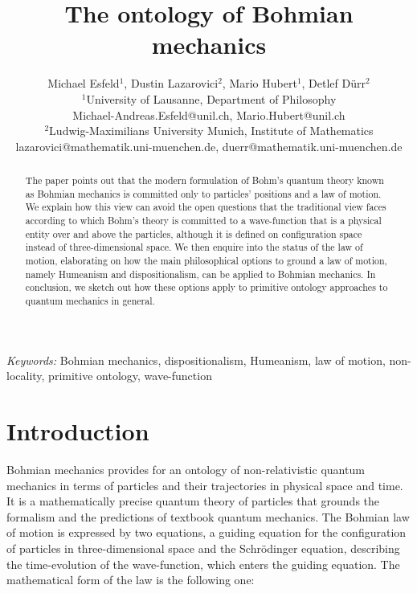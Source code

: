 \documentclass[12pt]{article}
\title{The ontology of Bohmian mechanics }
\author{Michael Esfeld$^1$, Dustin Lazarovici$^2$,
          Mario Hubert$^1$, Detlef D\"urr$^2$\\[1.5ex]
\small $^1$University of Lausanne, Department of Philosophy\\
                 \small Michael-Andreas.Esfeld@unil.ch, Mario.Hubert@unil.ch\\
\small $^2$Ludwig-Maximilians University Munich, Institute of Mathematics\\
\small   lazarovici@mathematik.uni-muenchen.de, duerr@mathematik.uni-muenchen.de}
\date{}
\theoremstyle{definition}
\begin{document}
\maketitle

\begin{abstract}
\noindent The paper points out that the modern formulation of Bohm's quantum theory known as Bohmian mechanics is committed only to particles' positions and a law of motion. We explain how this view can avoid the open questions that the traditional view faces according to which Bohm's theory is committed to a wave-function that is a physical entity over and above the particles, although it is defined on configuration space instead of three-dimensional space. We then enquire into the status of the law of motion, elaborating on how the main philosophical options to ground a law of motion, namely Humeanism and dispositionalism, can be applied to Bohmian mechanics. In conclusion, we sketch out how these options apply to primitive ontology approaches to quantum mechanics in general.
\end{abstract}

\noindent \textit{Keywords:} Bohmian mechanics, dispositionalism, Humeanism, law of motion, non-locality, primitive ontology, wave-function

\newpage
\tableofcontents{}
\newpage

\section{Introduction}
Bohmian mechanics provides for an ontology of non-relativistic quantum mechanics in terms of particles and their trajectories in physical space and time. It is a mathematically precise quantum theory of particles that grounds the formalism and the predictions of textbook quantum mechanics. The Bohmian law of motion is expressed by two equations, a guiding equation for the configuration of particles in three-dimensional space and the Schr\"odinger equation, describing the time-evolution of the wave-function, which enters the guiding equation. The mathematical form of the law is the following one:
\end{document}
